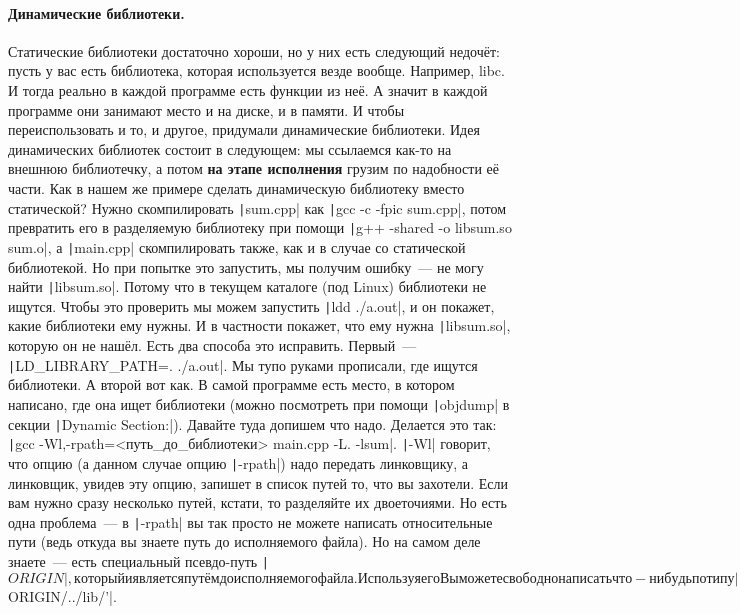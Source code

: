 \documentclass{article}
\begin{document}
    \paragraph{Динамические библиотеки.}
    Статические библиотеки достаточно хороши, но у них есть следующий недочёт: пусть у вас есть библиотека, которая используется везде вообще. Например, libc. И тогда реально в каждой программе есть функции из неё. А значит в каждой программе они занимают место и на диске, и в памяти. И чтобы переиспользовать и то, и другое, придумали динамические библиотеки. Идея динамических библиотек состоит в следующем: мы ссылаемся как-то на внешнюю библиотечку, а потом \textbf{на этапе исполнения} грузим по надобности её части. Как в нашем же примере сделать динамическую библиотеку вместо статической? Нужно скомпилировать \texttt|sum.cpp| как \texttt|gcc -c -fpic sum.cpp|, потом превратить его в разделяемую библиотеку при помощи \texttt|g++ -shared -o libsum.so sum.o|, а \texttt|main.cpp| скомпилировать также, как и в случае со статической библиотекой. Но при попытке это запустить, мы получим ошибку~--- не могу найти \texttt|libsum.so|. Потому что в текущем каталоге (под Linux) библиотеки не ищутся. Чтобы это проверить мы можем запустить \texttt|ldd ./a.out|, и он покажет, какие библиотеки ему нужны. И в частности покажет, что ему нужна \texttt|libsum.so|, которую он не нашёл. Есть два способа это исправить. Первый~--- \texttt|LD_LIBRARY_PATH=. ./a.out|. Мы тупо руками прописали, где ищутся библиотеки. А второй вот как. В самой программе есть место, в котором написано, где она ищет библиотеки (можно посмотреть при помощи \texttt|objdump| в секции \texttt|Dynamic Section:|). Давайте туда допишем что надо. Делается это так: \texttt|gcc -Wl,-rpath=<путь_до_библиотеки> main.cpp -L. -lsum|. \texttt|-Wl| говорит, что опцию (а данном случае опцию \texttt|-rpath|) надо передать линковщику, а линковщик, увидев эту опцию, запишет в список путей то, что вы захотели. Если вам нужно сразу несколько путей, кстати, то разделяйте их двоеточиями. Но есть одна проблема~--- в \texttt|-rpath| вы так просто не можете написать относительные пути (ведь откуда вы знаете путь до исполняемого файла). Но на самом деле знаете~--- есть специальный псевдо-путь \texttt|$ORIGIN|, который и является путём до исполняемого файла. Используя его Вы можете свободно написать что-нибудь по типу \texttt|-rpath='$ORIGIN/../lib/'|.\\
\end{document}
